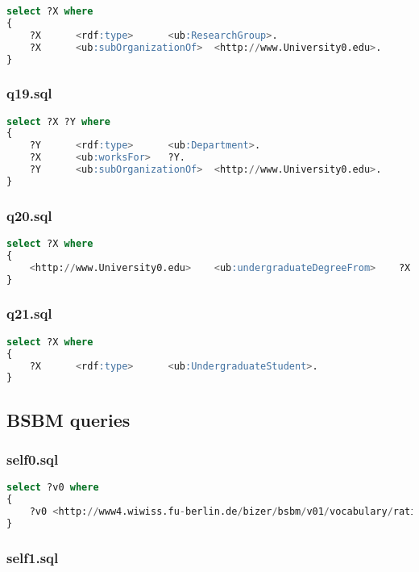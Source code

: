 \documentclass[titlepage, a4paper, 12pt] {article}
\begin{document}
\begin{lstlisting}[language=SQL]
select ?X where
{
	?X      <rdf:type>      <ub:ResearchGroup>.
	?X      <ub:subOrganizationOf>  <http://www.University0.edu>.
}
\end{lstlisting}

\subsubsection{q19.sql}

\begin{lstlisting}[language=SQL]
select ?X ?Y where
{
	?Y      <rdf:type>      <ub:Department>.
	?X      <ub:worksFor>   ?Y.
	?Y      <ub:subOrganizationOf>  <http://www.University0.edu>.
}
\end{lstlisting}

\subsubsection{q20.sql}

\begin{lstlisting}[language=SQL]
select ?X where
{
	<http://www.University0.edu>    <ub:undergraduateDegreeFrom>    ?X.
}
\end{lstlisting}

\subsubsection{q21.sql}

\begin{lstlisting}[language=SQL]
select ?X where
{
	?X      <rdf:type>      <ub:UndergraduateStudent>.
}
\end{lstlisting}

\subsection{BSBM queries}\label{bsbm}

\subsubsection{self0.sql}

\begin{lstlisting}[language=SQL] 
select ?v0 where
{
	?v0 <http://www4.wiwiss.fu-berlin.de/bizer/bsbm/v01/vocabulary/rating2> "6"^^<http://www.w3.org/2001/XMLSchema#integer> .
}
\end{lstlisting}

\subsubsection{self1.sql}
\end{document}
